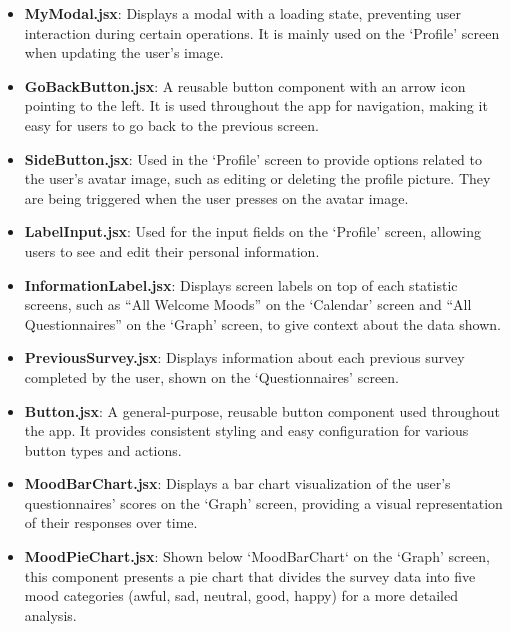 \begin{itemize}
\begin{itemize}
        \item \textbf{MyModal.jsx}: Displays a modal with a loading state, preventing user interaction during certain operations. It is mainly used on the `Profile' screen when updating the user’s image.
        
        \item \textbf{GoBackButton.jsx}: A reusable button component with an arrow icon pointing to the left. It is used throughout the app for navigation, making it easy for users to go back to the previous screen.
        
        \item \textbf{SideButton.jsx}: Used in the `Profile' screen to provide options related to the user’s avatar image, such as editing or deleting the profile picture. They are being triggered when the user presses on the avatar image.
        
        \item \textbf{LabelInput.jsx}: Used for the input fields on the `Profile' screen, allowing users to see and edit their personal information.
        
        \item \textbf{InformationLabel.jsx}: Displays screen labels on top of each statistic screens, such as “All Welcome Moods” on the `Calendar' screen and “All Questionnaires” on the `Graph' screen, to give context about the data shown.
        
        \item \textbf{PreviousSurvey.jsx}: Displays information about each previous survey completed by the user, shown on the `Questionnaires' screen.
        
        \item \textbf{Button.jsx}: A general-purpose, reusable button component used throughout the app. It provides consistent styling and easy configuration for various button types and actions.
        
        \item \textbf{MoodBarChart.jsx}: Displays a bar chart visualization of the user’s questionnaires' scores on the `Graph' screen, providing a visual representation of their responses over time.
        
        \item \textbf{MoodPieChart.jsx}: Shown below `MoodBarChart` on the `Graph' screen, this component presents a pie chart that divides the survey data into five mood categories (awful, sad, neutral, good, happy) for a more detailed analysis.
        

\end{itemize}
\end{itemize}
